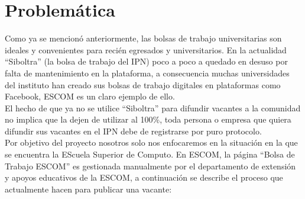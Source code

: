 \clearpage
\section{Problemática}
Como ya se mencionó anteriormente, las bolsas de trabajo universitarias son ideales y convenientes para recién egresados y universitarios.
En la actualidad ``Siboltra'' (la bolsa de trabajo del IPN) poco a poco a quedado en desuso por falta de mantenimiento en la plataforma, a consecuencia muchas universidades del instituto han creado sus bolsas de trabajo digitales en plataformas como Facebook, ESCOM es un claro ejemplo de ello.\\
\newline
El hecho de que ya no se utilice ``Siboltra'' para difundir vacantes a la comunidad no implica que la dejen de utilizar al 100\%, toda persona o empresa que quiera difundir sus vacantes en el IPN debe de registrarse por puro protocolo.\\
\newline
Por objetivo del proyecto nosotros solo nos enfocaremos en la situación en la que se encuentra la EScuela Superior de Computo.
En ESCOM, la página ``Bolsa de Trabajo ESCOM'' es gestionada manualmente por el departamento de extensión y apoyos educativos de la ESCOM, a continuación se describe el proceso que actualmente hacen para publicar una vacante:

